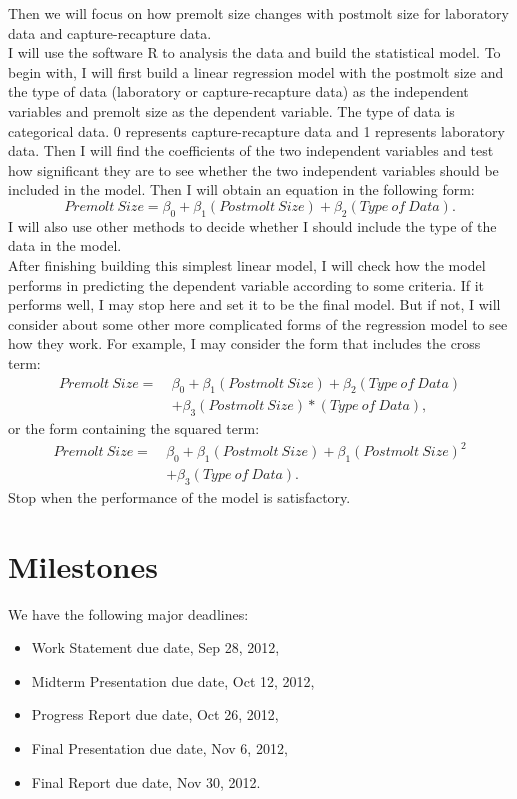 \documentclass[12pt,letterpaper]{article}
\theoremstyle{definition}
\begin{document}
\noindent Then we will focus on how premolt size changes with postmolt size for laboratory data and capture-recapture data.\\
I will use the software R to analysis the data and build the statistical model. To begin with, I will first build a linear regression model with the postmolt size and the type of data (laboratory or capture-recapture data) as the independent variables and premolt size as the dependent variable. The type of data is categorical data. 0 represents capture-recapture data and 1 represents laboratory data. Then I will find the coefficients of the two independent variables and test how significant they are to see whether the two independent variables should be included in the model. Then I will obtain an equation in the following form:
$$Premolt~Size=\beta_0 + \beta_1 (Postmolt~Size) + \beta_2 (Type~of~Data).$$ 
I will also use other methods to decide whether I should include the type of the data in the model.\\
After finishing building this simplest linear model, I will check how the model performs in predicting the dependent variable according to some criteria. If it performs well, I may stop here and set it to be the final model. But if not, I will consider about some other more complicated forms of the regression model to see how they work. For example, I may consider the form that includes the cross term:
\begin{align*}
Premolt~Size = ~&\beta_0 + \beta_1 (Postmolt~Size) + \beta_2 (Type~of~Data)\\
               & + \beta_3 (Postmolt~Size)*(Type~of~Data),
\end{align*}
or the form containing the squared term:
\begin{align*}
Premolt~Size = ~&\beta_0 + \beta_1 (Postmolt~Size) + \beta_1 (Postmolt~Size)^2\\
               & + \beta_3 (Type~of~Data).
\end{align*}
Stop when the performance of the model is satisfactory.

\section{Milestones}
We have the following major deadlines:
\begin{itemize}
    \item Work Statement due date, Sep 28, 2012,
    \item Midterm Presentation due date, Oct 12, 2012,
    \item Progress Report due date, Oct 26, 2012,
    \item Final Presentation due date, Nov 6, 2012,
    \item Final Report due date, Nov 30, 2012.
\end{itemize}
\end{document}
